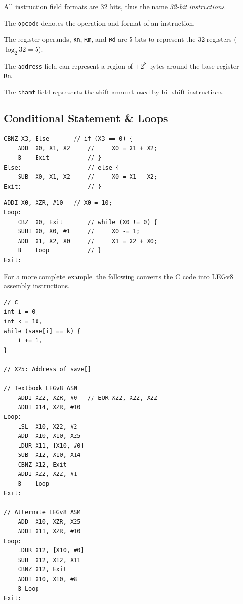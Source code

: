 \documentclass[11pt]{article}
\begin{document}
All instruction field formats are 32 bits, thus the name \textit{32-bit instructions}.

The \texttt{opcode} denotes the operation and format of an instruction.

The register operands, \texttt{Rn}, \texttt{Rm}, and \texttt{Rd} are 5 bits to represent the 32 registers ($\log_2{32}=5$).

The \texttt{address} field can represent a region of $\pm2^8$ bytes around the base register \texttt{Rn}.

The \texttt{shamt} field represents the shift amount used by bit-shift instructions.

\subsection*{Conditional Statement \& Loops}

\begin{lstlisting}[caption={Simple conditional statement implementation}]
    CBNZ X3, Else       // if (X3 == 0) {
    ADD  X0, X1, X2     //     X0 = X1 + X2;
    B    Exit           // }
Else:                   // else {
    SUB  X0, X1, X2     //     X0 = X1 - X2;
Exit:                   // }
\end{lstlisting}


\begin{lstlisting}[caption={Simple while loop implementation}]
    ADDI X0, XZR, #10   // X0 = 10;
Loop:
    CBZ  X0, Exit       // while (X0 != 0) {
    SUBI X0, X0, #1     //     X0 -= 1;
    ADD  X1, X2, X0     //     X1 = X2 + X0;
    B    Loop           // }
Exit:
\end{lstlisting}

For a more complete example, the following converts the C code into LEGv8 assembly instructions.

\begin{lstlisting}[caption={Sample C code loop into LEGv8 ASM}]
// C
int i = 0;
int k = 10;
while (save[i] == k) {
    i += 1;
}

// X25: Address of save[]

// Textbook LEGv8 ASM
    ADDI X22, XZR, #0   // EOR X22, X22, X22
    ADDI X14, XZR, #10
Loop:
    LSL  X10, X22, #2
    ADD  X10, X10, X25
    LDUR X11, [X10, #0]
    SUB  X12, X10, X14
    CBNZ X12, Exit
    ADDI X22, X22, #1
    B    Loop
Exit:

// Alternate LEGv8 ASM
    ADD  X10, XZR, X25
    ADDI X11, XZR, #10
Loop:
    LDUR X12, [X10, #0]
    SUB  X12, X12, X11
    CBNZ X12, Exit
    ADDI X10, X10, #8
    B Loop
Exit:
\end{lstlisting}
\end{document}
